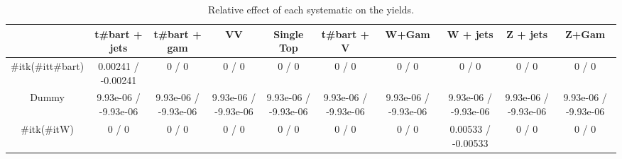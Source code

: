 \begin{table}[htbp]
\begin{center}
\footnotesize
\begin{tabular}{|c|c|c|c|c|c|c|c|c|c|}
\hline 
      & t#bar{t} + jets      & t#bar{t} +  gam      & VV      & Single Top      & t#bar{t} + V      & W+Gam      & W + jets      & Z + jets      & Z+Gam \\ 
\hline 
  #it{k}(#it{t#bar{t}}) & 0.00241 / -0.00241 & 0 / 0 & 0 / 0 & 0 / 0 & 0 / 0 & 0 / 0 & 0 / 0 & 0 / 0 & 0 / 0 \\ 
  Dummy & 9.93e-06 / -9.93e-06 & 9.93e-06 / -9.93e-06 & 9.93e-06 / -9.93e-06 & 9.93e-06 / -9.93e-06 & 9.93e-06 / -9.93e-06 & 9.93e-06 / -9.93e-06 & 9.93e-06 / -9.93e-06 & 9.93e-06 / -9.93e-06 & 9.93e-06 / -9.93e-06 \\ 
  #it{k}(#it{W}) & 0 / 0 & 0 / 0 & 0 / 0 & 0 / 0 & 0 / 0 & 0 / 0 & 0.00533 / -0.00533 & 0 / 0 & 0 / 0 \\ 
\hline 
\end{tabular} 
\caption{Relative effect of each systematic on the yields.} 
\end{center} 
\end{table} 
